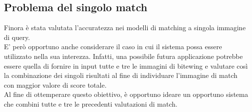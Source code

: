 \documentclass[12pt,a4paper,openright,twoside]{book}
\begin{document}
\subsection{Problema del singolo match}
Finora è stata valutata l'accuratezza nei modelli di matching a singola immagine di query. \\
E' però opportuno anche considerare il caso in cui il sistema possa essere utilizzato nella sua interezza. Infatti, una possibile futura applicazione potrebbe essere quella di fornire in input tutte e tre le immagini di bitewing e valutare così la combinazione dei singoli risultati al fine di individuare l'immagine di match con maggior valore di score totale.\\
Al fine di ottemperare questo obiettivo, è opportuno ideare un opportuno sistema che combini tutte e tre le precedenti valutazioni di match.

\end{document}
